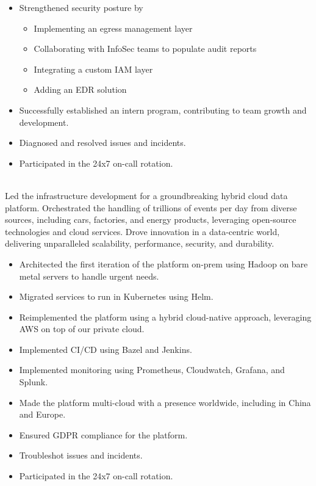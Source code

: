 \documentclass[]{cv-style}          %
\begin{document}
\begin{entrylist}
{\begin{itemize}
\item Strengthened security posture by
\begin{itemize}
    \item Implementing an egress management layer
    \item Collaborating with InfoSec teams to populate audit reports
    \item Integrating a custom IAM layer
    \item Adding an EDR solution
\end{itemize}
\item Successfully established an intern program, contributing to team growth and development.
\item Diagnosed and resolved issues and incidents.
\item Participated in the 24x7 on-call rotation.
\end{itemize}}
\entry
{}
{}
{}
{  \\
Led the infrastructure development for a groundbreaking hybrid cloud data platform. Orchestrated the handling of trillions of events per day from diverse sources, including cars, factories, and energy products, leveraging open-source technologies and cloud services. Drove innovation in a data-centric world, delivering unparalleled scalability, performance, security, and durability.
\begin{itemize}
\item Architected the first iteration of the platform on-prem using Hadoop on bare metal servers to handle urgent needs.
\item Migrated services to run in Kubernetes using Helm.
\item Reimplemented the platform using a hybrid cloud-native approach, leveraging AWS on top of our private cloud.
\item Implemented CI/CD using Bazel and Jenkins.
\item Implemented monitoring using Prometheus, Cloudwatch, Grafana, and Splunk.
\item Made the platform multi-cloud with a presence worldwide, including in China and Europe.
\item Ensured GDPR compliance for the platform.
\item Troubleshot issues and incidents.
\item Participated in the 24x7 on-call rotation.
\end{itemize}\vspace{+10pt}}


\end{entrylist}
\newpage
\end{document}
